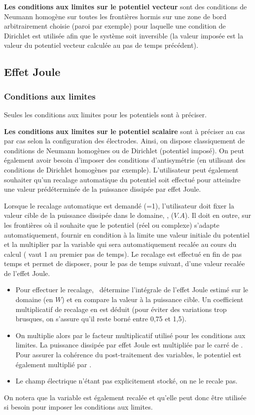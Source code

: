 \bigskip
{\bf Les conditions aux limites sur le potentiel vecteur} sont des conditions de
Neumann homog\`ene sur toutes les fronti\`eres hormis sur une zone de bord
arbitrairement choisie (paroi par exemple) pour laquelle une condition de
Dirichlet est utilis\'ee afin que le syst\`eme soit inversible 
(la valeur impos\'ee est la valeur du potentiel vecteur
calcul\'ee au pas de temps pr\'ec\'edent). 



\subsection{Effet Joule}

\subsubsection{Conditions aux limites}

Seules les conditions aux limites pour les potentiels sont \`a pr\'eciser. 

{\bf Les conditions aux limites sur le potentiel scalaire} sont \`a pr\'eciser
au cas par cas selon la configuration des \'electrodes. Ainsi, on dispose
classiquement de conditions de Neumann homog\`enes ou de Dirichlet (potentiel
impos\'e). On peut \'egalement avoir besoin d'imposer des conditions
d'antisym\'etrie (en utilisant des conditions de Dirichlet homog\`enes par exemple). 
L'utilisateur peut \'egalement souhaiter qu'un recalage automatique du potentiel
soit effectu\'e pour atteindre une valeur pr\'ed\'etermin\'ee de la puissance
dissip\'ee par effet Joule.  

Lorsque le recalage automatique est demand\'e (=1), l'utilisateur doit fixer la 
valeur cible de la puissance dissip\'ee dans le domaine, , ($V.A$). 
Il doit en outre, sur les fronti\`eres o\`u il
souhaite que le potentiel (r\'eel ou complexe) s'adapte automatiquement, fournir en
condition \`a la limite une valeur initiale du potentiel et la multiplier par
la variable  qui sera automatiquement recal\'ee au cours du calcul 
( vaut 1 au premier pas de temps). 
Le recalage est effectu\'e en fin de pas temps et permet de disposer, pour le pas
de temps suivant, d'une valeur recal\'ee de l'effet
Joule. 
\begin{itemize}
\item Pour effectuer le recalage, \CS\ d\'etermine l'int\'egrale de l'effet Joule 
estim\'e sur le domaine (en $W$) et en compare la
valeur \`a la puissance cible. Un coefficient multiplicatif de recalage  en
est d\'eduit (pour \'eviter des variations trop brusques, 
on s'assure qu'il reste born\'e entre 0,75 et 1,5). 
\item On multiplie alors par
 le facteur multiplicatif  utilis\'e pour les conditions aux
limites. La puissance dissip\'ee par effet
Joule est multipli\'ee par
le carr\'e de . Pour assurer la coh\'erence du post-traitement des
variables, le potentiel est \'egalement
multipli\'e par . 
\item Le champ \'electrique n'\'etant pas explicitement
stock\'e, on ne le recale pas.   
\end{itemize}

\bigskip
On notera que la variable  est \'egalement recal\'ee et qu'elle 
peut donc \^etre utilis\'ee si besoin pour imposer les conditions aux limites. 

